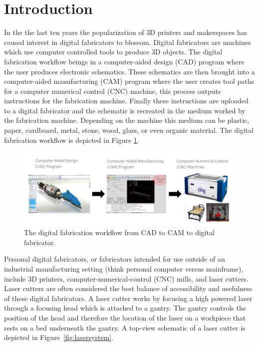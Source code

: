 

\section{Introduction}



In the the last ten years the popularization of 3D printers and makerspaces has caused interest in digital fabricators to blossom. Digital fabricators are machines which use computer controlled tools to produce 3D objects. The digital fabrication workflow beings in a computer-aided design (CAD) program where the user produces electronic schematics. These schematics are then brought into a computer-aided manufacturing (CAM) program where the user creates tool paths for a computer numerical control (CNC) machine, this process outputs instructions for the fabrication machine. Finally these instructions are uploaded to a digital fabricator and the schematic is recreated in the medium worked by the fabrication machine. Depending on the machine this medium can be plastic, paper, cardboard, metal, stone, wood, glass, or even organic material. The digital fabrication workflow is depicted in Figure \ref{fig:digiFabWorkflow}.

\begin{figure}[H]
  \includegraphics[width=\linewidth]{digiFabWorkflow.jpg}
  \caption{The digital fabrication workflow from CAD to CAM to digital fabricator.}
  \label{fig:digiFabWorkflow}
\end{figure}

Personal digital fabricators, or fabricators intended for use outside of an industrial manufacturing setting (think personal computer versus mainframe), include 3D printers, computer-numerical-control (CNC) mills, and laser cutters. Laser cutters are often considered the best balance of accessibility and usefulness of these digital fabricators. A laser cutter works by focusing a high powered laser through a focusing head which is attached to a gantry. The gantry controls the position of the head and therefore the location of the laser on a workpiece that rests on a bed underneath the gantry. A top-view schematic of a laser cutter is depicted in Figure~\ref{fig:lasersystem}.

